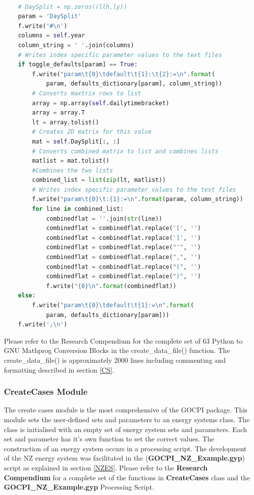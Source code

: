\documentclass[12pt]{article}
\begin{document}
\begin{lstlisting}[language=Python,label = {lst:TDCPGCB},caption = Two Dimensional Parameter Python to GNU Mathprog Conversion Block]

	# DaySplit = np.zeros((llh,ly))
	param = 'DaySplit'
	f.write('#\n')
	columns = self.year
	column_string = ' '.join(columns)
	# Writes index specific parameter values to the text files
	if toggle_defaults[param] == True:
		f.write("param\t{0}\tdefault\t{1}:\t{2}:=\n".format(
			param, defaults_dictionary[param], column_string))
		# Converts maxtrix rows to list
		array = np.array(self.dailytimebracket)
		array = array.T
		lt = array.tolist()
		# Creates 2D matrix for this value
		mat = self.DaySplit[:, :]
		# Converts combined matrix to list and combines lists
		matlist = mat.tolist()
		#Combines the two lists
		combined_list = list(zip(lt, matlist))
		# Writes index specific parameter values to the text files
		f.write("param\t{0}\t:{1}:=\n".format(param, column_string))
		for line in combined_list:
			combinedflat = ''.join(str(line))
			combinedflat = combinedflat.replace('[', '')
			combinedflat = combinedflat.replace(']', '')
			combinedflat = combinedflat.replace("'", '')
			combinedflat = combinedflat.replace(",", '')
			combinedflat = combinedflat.replace("(", '')
			combinedflat = combinedflat.replace(")", '')
			f.write("{0}\n".format(combinedflat))
	else:
		f.write("param\t{0}\tdefault\t{1}:=\n".format(
			param, defaults_dictionary[param]))
	f.write(';\n')
\end{lstlisting}
Please refer to the Research Compendium for the complete set of 63 Python to GNU Mathprog Conversion Blocks in the create\_data\_file() function.
The create\_data\_file() is approximately 2000 lines including commenting and formatting described in section \ref{CS}.

\subsubsection{CreateCases Module}
The create cases module is the most comprehensive of the GOCPI package.
This module sets the user-defined sets and parameters to an energy systems class.
The class is initialised with an empty set of energy system sets and parameters. 
Each set and parameter has it's own function to set the correct values.
The construction of an energy system occurs in a processing script.
The development of the NZ energy system was facilitated in the (\textbf{GOCPI\_NZ\_Example.gyp}) script as explained in section \ref{NZES}.
Please refer to the \textbf{Research Compendium} for a complete set of the functions in \textbf{CreateCases} class and the \textbf{GOCPI\_NZ\_Example.gyp} Processing Script.
\end{document}
